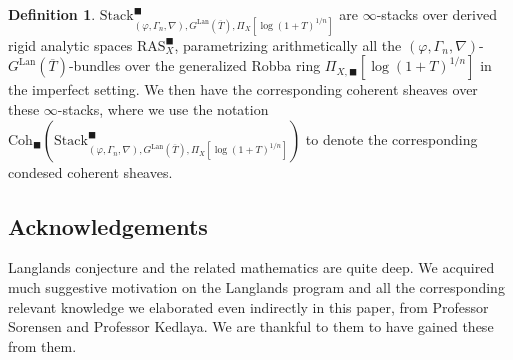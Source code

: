 \documentclass[12pt]{article}
\theoremstyle{definition}
\newtheorem{definition}{Definition}
\begin{document}
\begin{definition}
$\mathrm{Stack}^\blacksquare_{(\varphi,\Gamma_n,\nabla), G^\mathrm{Lan}(\overline{T}),\Pi_X[\log(1+T)^{1/n}]}$ are $\infty$-stacks over derived rigid analytic spaces $\mathrm{RAS}^\blacksquare_X$, parametrizing arithmetically all the $(\varphi,\Gamma_n,\nabla)$-$G^\mathrm{Lan}(\overline{T})$-bundles over the generalized Robba ring $\Pi_{X,\blacksquare}[\log(1+T)^{1/n}]$ in the imperfect setting. We then have the corresponding coherent sheaves over these $\infty$-stacks, where we use the notation $\mathrm{Coh}_\blacksquare(\mathrm{Stack}^\blacksquare_{(\varphi,\Gamma_n,\nabla), G^\mathrm{Lan}(\overline{T}),\Pi_X[\log(1+T)^{1/n}]})$ to denote the corresponding condesed coherent sheaves.
\end{definition}


\newpage
\subsection*{Acknowledgements}
Langlands conjecture and the related mathematics are quite deep. We acquired much suggestive motivation on the Langlands program and all the corresponding relevant knowledge we elaborated even indirectly in this paper, from Professor Sorensen and Professor Kedlaya. We are thankful to them to have gained these from them. 
\end{document}
